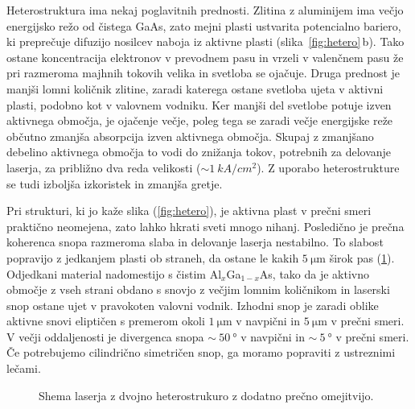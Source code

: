 Heterostruktura ima nekaj poglavitnih prednosti. Zlitina z aluminijem ima večjo 
energijsko režo od čistega GaAs, zato mejni plasti ustvarita potencialno bariero, 
ki preprečuje difuzijo nosilcev naboja iz aktivne plasti (slika~\ref{fig:hetero}\,b). Tako ostane koncentracija 
elektronov v prevodnem pasu in vrzeli v valenčnem pasu že pri razmeroma majhnih tokovih
velika in svetloba se ojačuje. Druga prednost je manjši lomni količnik zlitine, 
zaradi katerega ostane svetloba ujeta v aktivni plasti, podobno kot v valovnem 
vodniku. Ker manjši del svetlobe potuje izven aktivnega območja, je ojačenje večje,
poleg tega se zaradi večje energijske reže občutno zmanjša absorpcija izven aktivnega območja.
Skupaj z zmanjšano debelino aktivnega območja to vodi do znižanja tokov, 
potrebnih za delovanje laserja, za približno dva reda velikosti ($\sim 1~\si{kA}/\si{cm}^2$). 
Z uporabo heterostrukture se tudi izboljša izkoristek in zmanjša gretje.  

Pri strukturi, ki jo kaže slika (\ref{fig:hetero}), je aktivna plast v prečni smeri praktično neomejena, 
zato lahko hkrati sveti mnogo nihanj. Posledično je prečna koherenca snopa razmeroma slaba in 
delovanje laserja nestabilno. To slabost popravijo z jedkanjem plasti ob straneh, da ostane le
kakih $5~\si{\micro\meter}$ širok pas (\ref{fig:heshema}). Odjedkani material nadomestijo s čistim Al$_x$Ga$_{1-x}$As, 
tako da je aktivno območje z vseh strani obdano s snovjo z večjim lomnim količnikom in laserski
snop ostane ujet v pravokoten valovni vodnik. Izhodni snop je zaradi oblike aktivne snovi eliptičen s 
premerom okoli $1~\si{\micro\meter}$ v navpični in $5~\si{\micro\meter}$ v prečni smeri. 
V večji oddaljenosti je divergenca snopa $\sim~50~\si{\degree}$ v navpični in $\sim~5~\si{\degree}$ 
v prečni smeri. Če potrebujemo cilindrično simetričen snop, ga moramo popraviti z ustreznimi 
lečami.
\begin{figure}[h]
\centering
\def\svgwidth{85truemm} 

\caption{Shema laserja z dvojno heterostrukuro z dodatno prečno omejitvijo.
}
\label{fig:heshema}
\end{figure}

